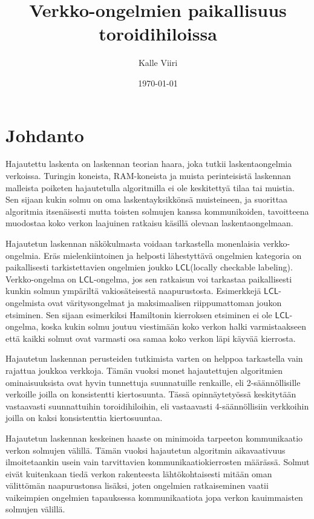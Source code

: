 \documentclass[12pt,finnish]{tktltiki2}
\title{Verkko-ongelmien paikallisuus toroidihiloissa}
\author{Kalle Viiri}
\date{\today}
\theoremstyle{definition}
\theoremstyle{remark}
\newcommand*{\lcl}{\ensuremath{\mathsf{LCL}}}
\begin{document}

\frontmatter      %

\maketitle        %
\makeabstract     %

\tableofcontents  %


\mainmatter       %

\section{Johdanto}
Hajautettu laskenta on laskennan teorian haara, joka tutkii laskentaongelmia verkoissa. Turingin koneista, RAM-koneista ja muista perinteisistä laskennan malleista poiketen hajautetulla algoritmilla ei ole keskitettyä tilaa tai muistia. Sen sijaan kukin solmu on oma laskentayksikkönsä muisteineen, ja suorittaa algoritmia itsenäisesti mutta toisten solmujen kanssa kommunikoiden, tavoitteena muodostaa koko verkon laajuinen ratkaisu käsillä olevaan laskentaongelmaan.

Hajautetun laskennan näkökulmasta voidaan tarkastella monenlaisia verkko-ongelmia. Eräs mielenkiintoinen ja helposti lähestyttävä ongelmien kategoria on paikallisesti tarkistettavien ongelmien joukko \lcl (locally checkable labeling). Verkko-ongelma on \lcl -ongelma, jos sen ratkaisun voi tarkastaa paikallisesti kunkin solmun ympäriltä vakiosäteisestä naapurustosta. Esimerkkejä \lcl -ongelmista ovat väritysongelmat ja maksimaalisen riippumattoman joukon etsiminen. Sen sijaan esimerkiksi Hamiltonin kierroksen etsiminen ei ole \lcl -ongelma, koska kukin solmu joutuu viestimään koko verkon halki varmistaakseen että kaikki solmut ovat varmasti osa samaa koko verkon läpi käyvää kierrosta. 

Hajautetun laskennan perusteiden tutkimista varten on helppoa tarkastella vain rajattua joukkoa verkkoja. Tämän vuoksi monet hajautettujen algoritmien ominaisuuksista ovat hyvin tunnettuja suunnatuille renkaille, eli 2-säännöllisille verkoille joilla on konsistentti kiertosuunta. Tässä opinnäytetyössä keskitytään vastaavasti suunnattuihin toroidihiloihin, eli vastaavasti 4-säännöllisiin verkkoihin joilla on kaksi konsistenttia kiertosuuntaa.

Hajautetun laskennan keskeinen haaste on minimoida tarpeeton kommunikaatio verkon solmujen välillä. Tämän vuoksi hajautetun algoritmin aikavaativuus ilmoitetaankin usein vain tarvittavien kommunikaatiokierrosten määrässä. Solmut eivät kuitenkaan tiedä verkon rakenteesta lähtökohtaisesti mitään oman välittömän naapurustonsa lisäksi, joten ongelmien ratkaiseminen vaatii vaikeimpien ongelmien tapauksessa kommunikaatiota jopa verkon kauimmaisten solmujen välillä.
\end{document}
